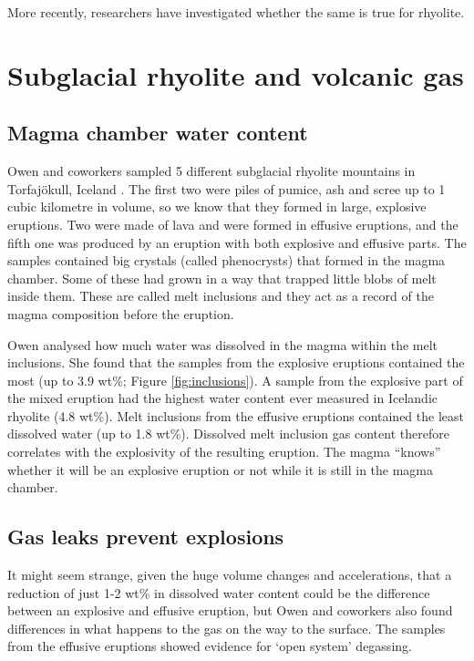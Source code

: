\documentclass[a4paper,11pt]{article}
\begin{document}
More recently, researchers have investigated whether the same is true for rhyolite.


\section{Subglacial rhyolite and volcanic gas}
\subsection{Magma chamber water content}
\label{sec:chamber}

Owen and coworkers sampled 5 different subglacial rhyolite mountains in Torfaj\"okull, Iceland \citet{owen_explosive_2012}.  The first two were piles of pumice, ash and scree up to 1 cubic kilometre in volume, so we know that they formed in large, explosive eruptions. Two were made of lava and were formed in effusive eruptions, and the fifth one was produced by an eruption with both explosive and effusive parts.  The samples contained big crystals (called phenocrysts) that formed in the magma chamber. Some of these had grown in a way that trapped little blobs of melt inside them. These are called melt inclusions and they act as a record of the magma composition before the eruption.

Owen analysed how much water was dissolved in the magma within the melt inclusions.  She found that the samples from the explosive eruptions contained the most (up to 3.9 wt\%; Figure \ref{fig:inclusions}).  A sample from the explosive part of the mixed eruption had the highest water content ever measured in Icelandic rhyolite (4.8 wt\%). Melt inclusions from the effusive eruptions contained the least dissolved water (up to 1.8 wt\%). Dissolved melt inclusion gas content therefore correlates with the explosivity of the resulting eruption. The magma ``knows'' whether it will be an explosive eruption or not while it is still in the magma chamber.

\subsection{Gas leaks prevent explosions}

It might seem strange, given the huge volume changes and accelerations, that a reduction of just 1-2 wt\% in dissolved water content could be the difference between an explosive and effusive eruption, but Owen and coworkers also found differences in what happens to the gas on the way to the surface. The samples from the effusive eruptions showed evidence for `open system' degassing.
\end{document}
